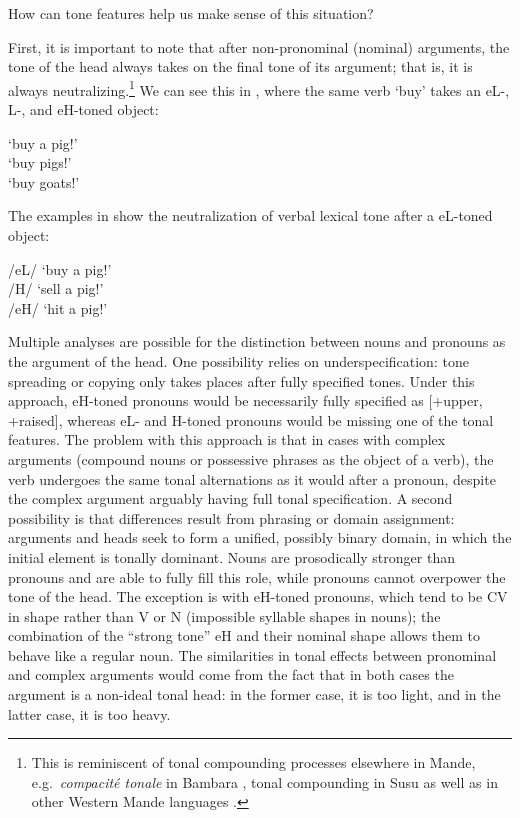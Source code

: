 \documentclass[output=paper]{langsci/langscibook}
\begin{document}
How can tone features help us make sense of this situation?

First, it is important to note that after non-pronominal (nominal) arguments, the tone of the head always takes on the final tone of its argument; that is, it is always neutralizing.\footnote{This is reminiscent of tonal compounding processes elsewhere in Mande, e.g.\ {\it compacit\'e tonale} in Bambara \citep{Creissels78,Creissels88,Creissels92,Dumestre84,Green10}, tonal compounding in Susu \citep{Gregoire78,Greenetal13} as well as in other Western Mande languages \citep{deZeeuw79}.} We can see this in , where the same verb {\it {}} `buy' takes an eL-, L-, and eH-toned object:

\ea\label{ex:mcpherson:20} 
\ea\label{ex:mcpherson:20a} {\it {} } `buy a pig!' \\
\ex\label{ex:mcpherson:20b} {\it {} } `buy pigs!' \\
\ex\label{ex:mcpherson:20c} {\it {} } `buy goats!' \\
\z
\z

The examples in  show the neutralization of verbal lexical tone after a eL-toned object:

\ea\label{ex:mcpherson:21} 
\ea\label{ex:mcpherson:21a} /eL/ {\it {} } `buy a pig!' \\
\ex\label{ex:mcpherson:21b} /H/ {\it {} } `sell a pig!' \\
\ex\label{ex:mcpherson:21c} /eH/ {\it {} } `hit a pig!' \\
\z
\z

Multiple analyses are possible for the distinction between nouns and pronouns as the argument of the head. One possibility relies on underspecification: tone spreading or copying only takes places after fully specified tones. Under this approach, eH-toned pronouns would be necessarily fully specified as [+upper, +raised], whereas eL- and H-toned pronouns would be missing one of the tonal features. The problem with this approach is that in cases with complex arguments (compound nouns or possessive phrases as the object of a verb), the verb undergoes the same tonal alternations as it would after a pronoun, despite the complex argument arguably having full tonal specification. A second possibility is that differences result from phrasing or domain assignment: arguments and heads seek to form a unified, possibly binary domain, in which the initial element is tonally dominant. Nouns are prosodically stronger than pronouns and are able to fully fill this role, while pronouns cannot overpower the tone of the head. The exception is with eH-toned pronouns, which tend to be CV in shape rather than V or N (impossible syllable shapes in nouns); the combination of the ``strong tone'' eH and their nominal shape allows them to behave like a regular noun. The similarities in tonal effects between pronominal and complex arguments would come from the fact that in both cases the argument is a non-ideal tonal head: in the former case, it is too light, and in the latter case, it is too heavy.
\end{document}
